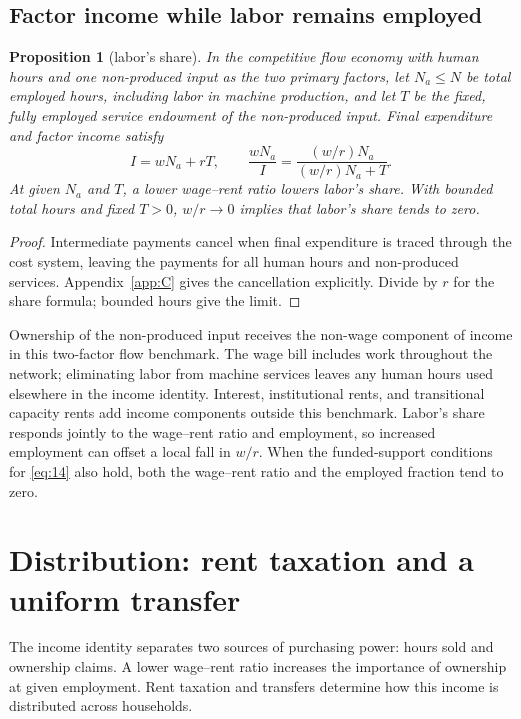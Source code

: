 \documentclass[12pt]{article}
\theoremstyle{plain}
\newtheorem{proposition}{Proposition}
\begin{document}
\subsection{Factor income while labor remains employed}\label{sec:6.2}

\begin{proposition}[labor's share]\label{prop:5}
In the competitive flow economy with human hours and one non-produced input as the two primary factors, let $N_a\le N$ be total employed hours, including labor in machine production, and let $T$ be the fixed, fully employed service endowment of the non-produced input. Final expenditure and factor income satisfy
\begin{equation}\label{eq:15}
I=wN_a+rT,\qquad
\frac{wN_a}{I}=\frac{(w/r)N_a}{(w/r)N_a+T}.
\end{equation}
At given $N_a$ and $T$, a lower wage--rent ratio lowers labor's share. With bounded total hours and fixed $T>0$, $w/r\to0$ implies that labor's share tends to zero.
\end{proposition}

\begin{proof}
Intermediate payments cancel when final expenditure is traced through the cost system, leaving the payments for all human hours and non-produced services. Appendix~\ref{app:C} gives the cancellation explicitly. Divide by $r$ for the share formula; bounded hours give the limit.
\end{proof}

Ownership of the non-produced input receives the non-wage component of income in this two-factor flow benchmark. The wage bill includes work throughout the network; eliminating labor from machine services leaves any human hours used elsewhere in the income identity. Interest, institutional rents, and transitional capacity rents add income components outside this benchmark. Labor's share responds jointly to the wage--rent ratio and employment, so increased employment can offset a local fall in $w/r$. When the funded-support conditions for \eqref{eq:14} also hold, both the wage--rent ratio and the employed fraction tend to zero.

\section{Distribution: rent taxation and a uniform transfer}\label{sec:7}

The income identity separates two sources of purchasing power: hours sold and ownership claims. A lower wage--rent ratio increases the importance of ownership at given employment. Rent taxation and transfers determine how this income is distributed across households.
\end{document}
